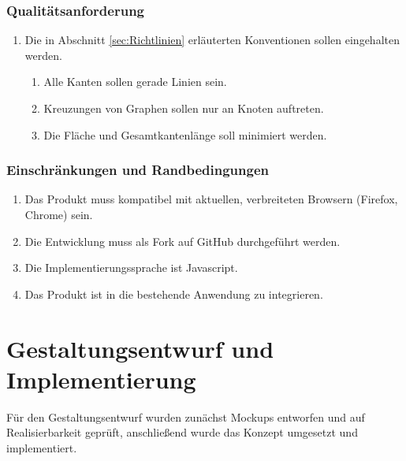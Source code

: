 \documentclass[nocolor]{tudbook}
\begin{document}
\subsection{Qualitätsanforderung}
\begin{enumerate}[Q1]
	\item Die in Abschnitt \ref{sec:Richtlinien} erläuterten Konventionen sollen eingehalten werden.
	\begin{enumerate}[{Q1}.1]
		\item Alle Kanten sollen gerade Linien sein.
		\item Kreuzungen von Graphen sollen nur an Knoten auftreten.
		\item Die Fläche und Gesamtkantenlänge soll minimiert werden.
	\end{enumerate}
\end{enumerate}

\subsection{Einschränkungen und Randbedingungen}
\begin{enumerate}[R1]
	\item Das Produkt muss kompatibel mit aktuellen, verbreiteten Browsern (Firefox, Chrome) sein.
	\item Die Entwicklung muss als Fork auf GitHub durchgeführt werden.
	\item Die Implementierungssprache ist Javascript.
	\item Das Produkt ist in die bestehende Anwendung zu integrieren.
\end{enumerate}

\chapter{Gestaltungsentwurf und Implementierung}
Für den Gestaltungsentwurf wurden zunächst Mockups entworfen und auf Realisierbarkeit geprüft, anschließend wurde das Konzept umgesetzt und implementiert.
\end{document}
